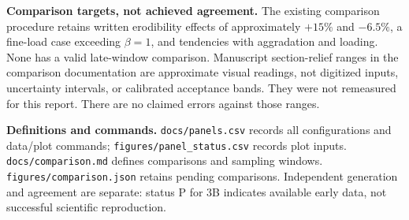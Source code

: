 \documentclass[10pt,letterpaper]{article}
\newcommand{\file}[1]{\nolinkurl{#1}}
\begin{document}
\textbf{Comparison targets, not achieved agreement.} The existing comparison procedure retains written erodibility effects of approximately $+15\%$ and $-6.5\%$, a fine-load case exceeding $\beta=1$, and tendencies with aggradation and loading. None has a valid late-window comparison. Manuscript section-relief ranges in the comparison documentation are approximate visual readings, not digitized inputs, uncertainty intervals, or calibrated acceptance bands. They were not remeasured for this report. There are no claimed errors against those ranges.

\textbf{Definitions and commands.} \file{docs/panels.csv} records all configurations and data/plot commands; \file{figures/panel_status.csv} records plot inputs. \file{docs/comparison.md} defines comparisons and sampling windows. \file{figures/comparison.json} retains pending comparisons. Independent generation and agreement are separate: status P for 3B indicates available early data, not successful scientific reproduction.
\end{document}
